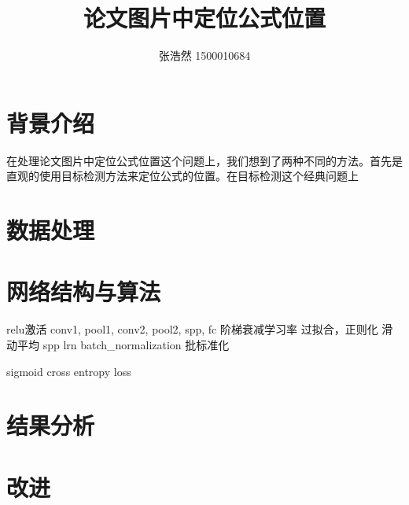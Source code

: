 \documentclass{article}
\title{论文图片中定位公式位置}
\author{张浩然 1500010684}
\date{}
\begin{document}


\maketitle
\tableofcontents

\abstract{}

\newpage

\section{背景介绍}
\noindent

在处理论文图片中定位公式位置这个问题上，我们想到了两种不同的方法。首先是直观的使用目标检测方法来定位公式的位置。在目标检测这个经典问题上


\section{数据处理}

\section{网络结构与算法}
\noindent

relu激活
conv1, pool1, conv2, pool2, spp, fc
阶梯衰减学习率
过拟合，正则化
滑动平均
spp
lrn
batch\_normalization 批标准化

sigmoid cross entropy loss

\cite{rcnn}
\cite{spp}
\cite{frcnn}
\cite{ftrcnn}
\cite{mrcnn}
\cite{yolo}
\cite{ssd}
\cite{ctpn}

\section{结果分析}

\section{改进}




\end{document}
